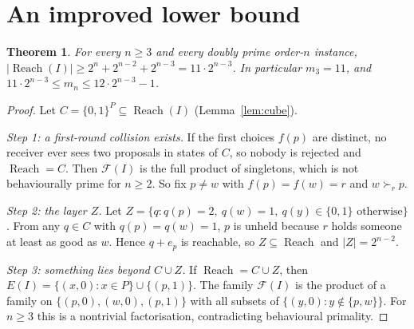 \documentclass[11pt]{article}
\newtheorem{theorem}{Theorem}
\theoremstyle{definition}
\begin{document}
\section*{An improved lower bound}
\begin{theorem}\label{thm:lower}
For every $n\ge3$ and every doubly prime order-$n$ instance,
$|\operatorname{Reach}(I)|\ge2^n+2^{n-2}+2^{n-3}=11\cdot2^{n-3}$.
In particular $m_3=11$, and $11\cdot2^{n-3}\le m_n\le12\cdot2^{n-3}-1$.
\end{theorem}
\begin{proof}
Let $C=\{0,1\}^P\subseteq\operatorname{Reach}(I)$ (Lemma~\ref{lem:cube}).

\emph{Step 1: a first-round collision exists.} If the first choices $f(p)$ are distinct, no receiver
ever sees two proposals in states of $C$, so nobody is rejected and $\operatorname{Reach}=C$.
Then $\mathcal F(I)$ is the full product of singletons, which is not behaviourally prime for $n\ge2$. So fix $p\ne w$
with $f(p)=f(w)=r$ and $w\succ_rp$.

\emph{Step 2: the layer $Z$.} Let $Z=\{q:q(p)=2,\ q(w)=1,\ q(y)\in\{0,1\}\text{ otherwise}\}$.
From any $q\in C$ with $q(p)=q(w)=1$, $p$ is unheld because $r$ holds someone at least as good as $w$.
Hence $q+e_p$ is reachable, so $Z\subseteq\operatorname{Reach}$ and $|Z|=2^{n-2}$.

\emph{Step 3: something lies beyond $C\cup Z$.} If $\operatorname{Reach}=C\cup Z$, then
$E(I)=\{(x,0):x\in P\}\cup\{(p,1)\}$. The family $\mathcal F(I)$ is the product of a family on
$\{(p,0),(w,0),(p,1)\}$ with all subsets of $\{(y,0):y\notin\{p,w\}\}$. For $n\ge3$ this is a
nontrivial factorisation, contradicting behavioural primality.


\end{proof}
\end{document}
